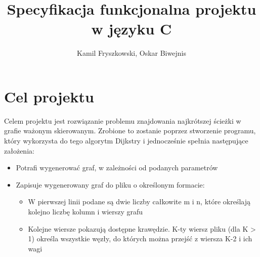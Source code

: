 \documentclass{article}
\title{Specyfikacja funkcjonalna projektu w języku C}
\author{Kamil Fryszkowski, Oskar Biwejnis}
\begin{document}
\maketitle
\thispagestyle{fancy}

\section{Cel projektu}
Celem projektu jest rozwiązanie problemu znajdowania najkrótszej ścieżki w grafie ważonym skierowanym.
Zrobione to zostanie poprzez stworzenie programu, który wykorzysta do tego algorytm Dijkstry i jednocześnie spełnia następujące założenia:
\begin{itemize}
\item Potrafi wygenerować graf, w zależności od podanych parametrów
\item Zapisuje wygenerowany graf do pliku o określonym formacie:
\begin{itemize}
\item W pierwszej linii podane są dwie liczby całkowite m i n, które określają kolejno liczbę kolumn i wierszy grafu
\item Kolejne wiersze pokazują dostępne krawędzie. K-ty wiersz pliku (dla K > 1) określa wszystkie węzły, do których można przejść z wiersza K-2 i ich wagi


\end{itemize}
\end{itemize}
\end{document}
